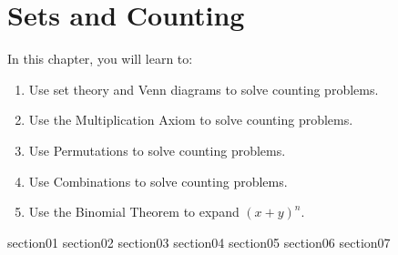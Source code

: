 \chapter{Sets and Counting}

In this chapter, you will learn to:
\begin{enumerate}
    \item Use set theory and Venn diagrams to solve counting problems.
    \item Use the Multiplication Axiom to solve counting problems.
    \item Use Permutations to solve counting problems.
    \item Use Combinations to solve counting problems.
    \item Use the Binomial Theorem to expand $(x + y)^n$.
\end{enumerate}

{section01}
{section02}
{section03}
{section04}
{section05}
{section06}
{section07}